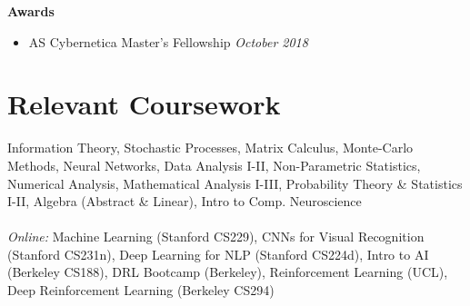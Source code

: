 \documentclass[margin,line]{res}
\begin{document}
\begin{resume}
\vspace*{-.1in}
{\bf Awards}
\begin{itemize}
    \item[ ] AS Cybernetica Master's Fellowship \hfill {\it October 2018}
\end{itemize}


\section{\sc Relevant Coursework}
Information Theory, Stochastic Processes, Matrix Calculus, Monte-Carlo Methods, Neural Networks, Data Analysis I-II, Non-Parametric Statistics, Numerical Analysis, Mathematical Analysis I-III, Probability Theory \& Statistics I-II, Algebra (Abstract \& Linear), Intro to Comp. Neuroscience
\vspace*{-.1in}
\\\\
{\it Online:} Machine Learning (Stanford CS229), CNNs for Visual Recognition (Stanford CS231n), Deep Learning for NLP (Stanford CS224d),
Intro to AI (Berkeley CS188), DRL Bootcamp (Berkeley), Reinforcement Learning (UCL), Deep Reinforcement Learning (Berkeley CS294)


\end{resume}
\end{document}
